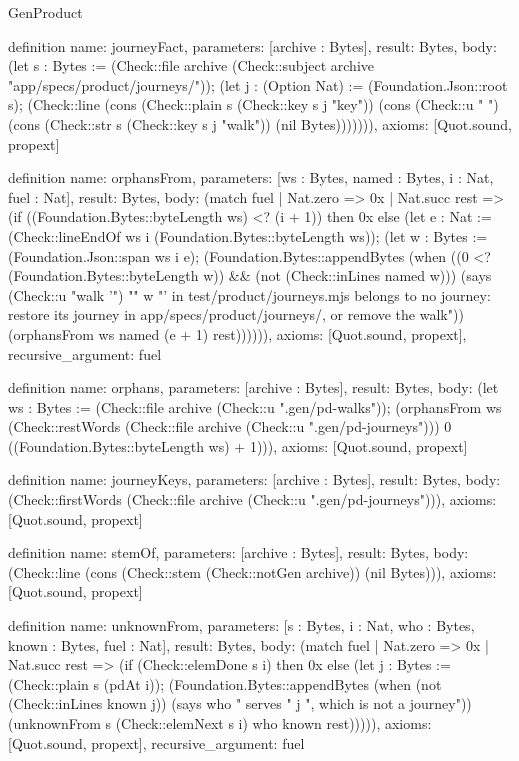 \begin{lexlean}{GenProduct}
\begin{semanticmodule}
{definition{
  name: journeyFact,
  parameters: [archive : Bytes],
  result: Bytes,
  body: (let s : Bytes := (Check::file archive (Check::subject archive "app/specs/product/journeys/")); (let j : (Option Nat) := (Foundation.Json::root s); (Check::line (cons (Check::plain s (Check::key s j "key")) (cons (Check::u " ") (cons (Check::str s (Check::key s j "walk")) (nil Bytes))))))),
  axioms: [Quot.sound, propext]
}

definition{
  name: orphansFrom,
  parameters: [ws : Bytes, named : Bytes, i : Nat, fuel : Nat],
  result: Bytes,
  body: (match fuel
    | Nat.zero => 0x
    | Nat.succ rest => (if ((Foundation.Bytes::byteLength ws) <? (i + 1)) then 0x else (let e : Nat := (Check::lineEndOf ws i (Foundation.Bytes::byteLength ws)); (let w : Bytes := (Foundation.Json::span ws i e); (Foundation.Bytes::appendBytes (when ((0 <? (Foundation.Bytes::byteLength w)) && (not (Check::inLines named w))) (says (Check::u "walk '") "" w "' in test/product/journeys.mjs belongs to no journey: restore its journey in app/specs/product/journeys/, or remove the walk")) (orphansFrom ws named (e + 1) rest)))))),
  axioms: [Quot.sound, propext],
  recursive_argument: fuel
}

definition{
  name: orphans,
  parameters: [archive : Bytes],
  result: Bytes,
  body: (let ws : Bytes := (Check::file archive (Check::u ".gen/pd-walks")); (orphansFrom ws (Check::restWords (Check::file archive (Check::u ".gen/pd-journeys"))) 0 ((Foundation.Bytes::byteLength ws) + 1))),
  axioms: [Quot.sound, propext]
}

definition{
  name: journeyKeys,
  parameters: [archive : Bytes],
  result: Bytes,
  body: (Check::firstWords (Check::file archive (Check::u ".gen/pd-journeys"))),
  axioms: [Quot.sound, propext]
}

definition{
  name: stemOf,
  parameters: [archive : Bytes],
  result: Bytes,
  body: (Check::line (cons (Check::stem (Check::notGen archive)) (nil Bytes))),
  axioms: [Quot.sound, propext]
}

definition{
  name: unknownFrom,
  parameters: [s : Bytes, i : Nat, who : Bytes, known : Bytes, fuel : Nat],
  result: Bytes,
  body: (match fuel
    | Nat.zero => 0x
    | Nat.succ rest => (if (Check::elemDone s i) then 0x else (let j : Bytes := (Check::plain s (pdAt i)); (Foundation.Bytes::appendBytes (when (not (Check::inLines known j)) (says who " serves " j ", which is not a journey")) (unknownFrom s (Check::elemNext s i) who known rest))))),
  axioms: [Quot.sound, propext],
  recursive_argument: fuel
}

}
\end{semanticmodule}
\end{lexlean}
